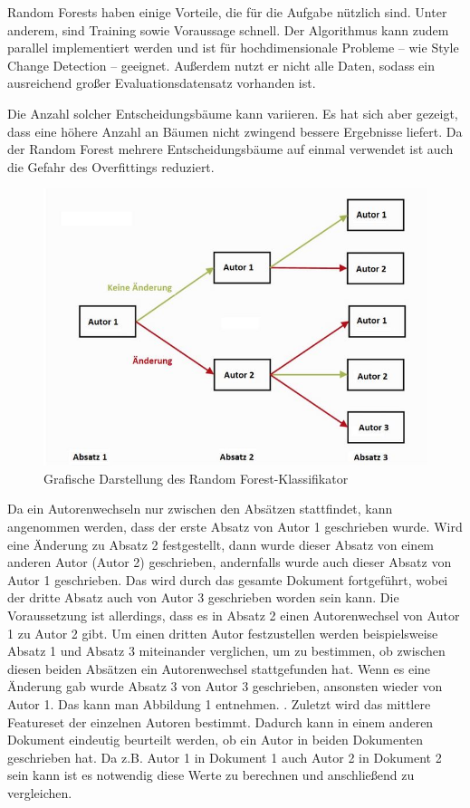 \documentclass[conference]{IEEEtran}
\begin{document}
	Random Forests haben einige Vorteile, die für die Aufgabe nützlich sind. Unter anderem, sind Training sowie Voraussage schnell. Der Algorithmus kann zudem parallel implementiert werden und ist für hochdimensionale Probleme – wie Style Change Detection – geeignet. \cite{ma_b2} Außerdem nutzt er nicht alle Daten, sodass ein ausreichend großer Evaluationsdatensatz vorhanden ist.
	
	Die Anzahl solcher Entscheidungsbäume kann variieren. Es hat sich aber gezeigt, dass eine höhere Anzahl an Bäumen nicht zwingend bessere Ergebnisse liefert. Da der Random Forest mehrere Entscheidungsbäume auf einmal verwendet ist auch die Gefahr des Overfittings reduziert. \cite{ma_b2}
	
	\begin{figure}[h]
		\centering
		\includegraphics[width=0.7\linewidth]{Unbenannt}
		\caption{Grafische Darstellung des Random Forest-Klassifikator}
		\label{fig:algorithm}
	\end{figure}
	
	
	Da ein Autorenwechseln nur zwischen den Absätzen stattfindet, kann angenommen werden, dass der erste Absatz von Autor 1 geschrieben wurde. Wird eine Änderung zu Absatz 2 festgestellt, dann wurde dieser Absatz von einem anderen Autor (Autor 2) geschrieben, andernfalls wurde auch dieser Absatz von Autor 1 geschrieben. Das wird durch das gesamte Dokument fortgeführt, wobei der dritte Absatz auch von Autor 3  geschrieben worden sein kann. Die Voraussetzung ist allerdings, dass es in Absatz 2 einen Autorenwechsel von Autor 1 zu Autor 2 gibt. Um einen dritten Autor festzustellen werden beispielsweise Absatz 1 und Absatz 3 miteinander verglichen, um zu bestimmen, ob zwischen diesen beiden Absätzen ein Autorenwechsel stattgefunden hat. Wenn es eine Änderung gab wurde Absatz 3 von Autor 3 geschrieben, ansonsten wieder von Autor 1. Das kann man Abbildung 1 entnehmen. 
	.
	Zuletzt wird das mittlere Featureset der einzelnen Autoren bestimmt. Dadurch kann in einem anderen Dokument eindeutig beurteilt werden, ob ein Autor in beiden Dokumenten geschrieben hat. Da z.B. Autor 1 in Dokument 1 auch Autor 2 in Dokument 2 sein kann ist es notwendig diese Werte zu berechnen und anschließend zu vergleichen.
	
\end{document}
